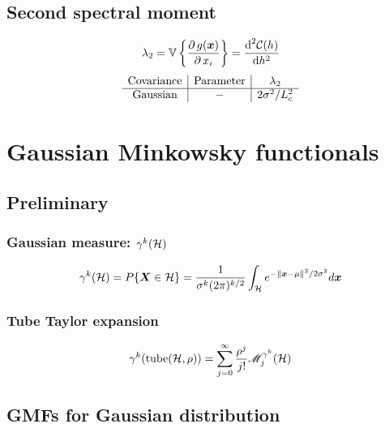 \documentclass[12pt]{article}
\begin{document}
\subsection{Second spectral moment}
\begin{equation}
  \lambda_2=\mathbb{V}\left\{\frac{\partial\, g(\boldsymbol{x})}{\partial\, x_i}\right\}= \frac{\text{d}^2\mathcal{C}(h)}{\text{d}h^2}
\end{equation}
\begin{equation}
  \begin{array}{c|c|c}
    \text{Covariance} & \text{Parameter} & \lambda_2 \\
    \hline
    \text{Gaussian} & - & 2\sigma^2/L_c^2\\
  \end{array}
\end{equation}

\section{Gaussian Minkowsky functionals}
\subsection{Preliminary}
\subsubsection{Gaussian measure: $\gamma^k(\mathcal{H})$}
\begin{equation}
  \gamma^k(\mathcal{H}) = P\{\boldsymbol{X}\in\mathcal{H}\}=\frac{1}{\sigma^k(2\pi)^{k/2}} \int_{\mathcal{H}} e^{-\|\boldsymbol{x}-\mu\|^2/2\sigma^2} d\boldsymbol{x}
\end{equation}
\subsubsection{Tube Taylor expansion}
\begin{equation}
  \gamma^k(\text{tube}(\mathcal{H},\rho))=\sum_{j=0}^{\infty} \frac{\rho^j}{j!}\mathscr{M}^{\gamma^k}_j(\mathcal{H})
\end{equation}

\subsection{GMFs for Gaussian distribution}
\end{document}
